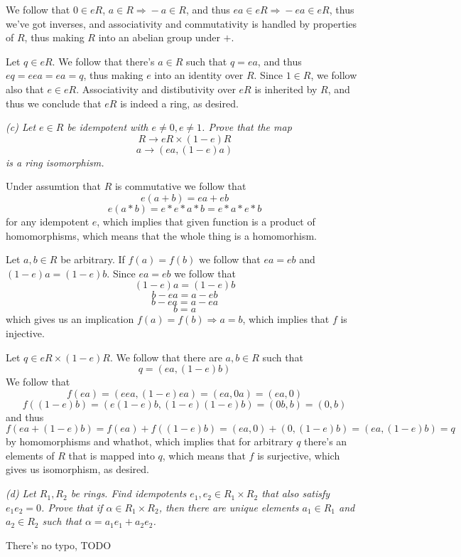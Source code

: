 \documentclass[11pt,oneside,titlepage]{book}
\DeclareMathOperator \ra {\Rightarrow}
\begin{document}
We follow that $0 \in eR$, $a \in R \ra -a \in R$, and thus $ea \in eR
\ra -ea \in eR$, thus we've got inverses, and associativity and
commutativity is handled by properties of $R$, thus making $R$ into an
abelian group under $+$.

Let $q \in eR$. We follow that there's $a \in R$ such that $q = ea$,
and thus $eq = eea = ea = q$, thus making $e$ into an identity over
$R$. Since $1 \in R$, we follow also that $e \in eR$. Associativity
and distibutivity over $eR$ is inherited by $R$, and thus we conclude that
$eR$ is indeed a ring, as desired.

\textit{(c) Let $e \in R$ be idempotent with $e \neq 0, e \neq
1$. Prove that the map
  $$R \to eR \times (1 - e)R$$
  $$a \to (ea, (1 - e)a)$$
  is a ring isomorphism.}

Under assumtion that $R$ is commutative we follow that
$$ e (a + b) = e a + eb $$
$$ e (a * b) = e * e * a * b = e * a * e * b $$
for any idempotent $e$, which implies that given function is a product
of homomorphisms, which means that the whole thing is a homomorhism.

Let $a, b \in R$ be arbitrary.  If $f(a) = f(b)$ we follow that $ea =
eb$ and $(1 - e)a = (1 - e)b$.  Since $ea = eb$ we follow that
$$(1 - e)a = (1 - e)b$$
$$b - ea = a - eb$$
$$b - ea = a - ea$$
$$b = a$$
which gives us an implication $f(a) = f(b) \ra a = b$, which implies
that $f$ is injective.

Let $q \in eR \times (1 - e)R$. We follow that there are $a, b \in R$
such that
$$q = (ea, (1 - e)b)$$
We follow that
$$f(ea) = (eea, (1 - e)ea) = (ea, 0a) = (ea, 0)$$
$$f((1 - e)b) = (e(1 - e)b, (1 - e)(1 - e)b) = (0 b, b) = (0, b)$$
and thus
$$f(ea + (1 - e)b) = f(ea) + f((1 - e)b)
= (ea, 0) + (0, (1 - e)b) = (ea, (1 - e)b) = q$$
by homomorphisms and whathot, which implies that for arbitrary $q$
there's an elements of $R$ that is mapped into $q$, which means that
$f$ is surjective, which gives us isomorphism, as desired.

\textit{(d) Let $R_1, R_2$ be rings. Find idempotents $e_1, e_2 \in
R_1 \times R_2$ that also satisfy $e_1 e_2 = 0$. Prove that if $\alpha
\in R_1 \times R_2$, then there are unique elements $a_1 \in R_1$ and
$a_2 \in R_2$ such that $\alpha = a_1 e_1 + a_2 e_2$.}

There's no typo, TODO

\subsection{}
\end{document}
